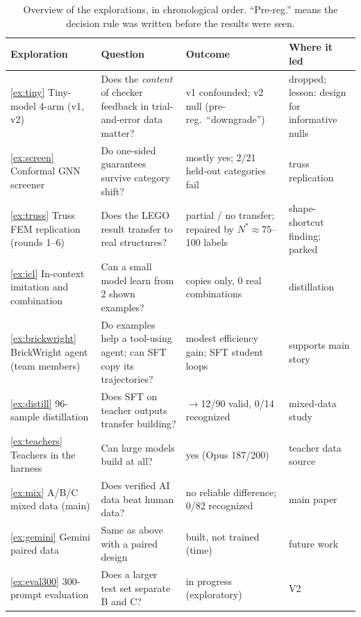 \begin{table}[t]
\centering\small
\caption{Overview of the explorations, in chronological order. ``Pre-reg.'' means the decision rule was written before the results were seen.}
\label{tab:explore}
\setlength{\tabcolsep}{4pt}
\begin{tabularx}{\linewidth}{@{}*{4}{>{\raggedright\arraybackslash}X}@{}}
\toprule
Exploration & Question & Outcome & Where it led \\
\midrule
\ref{ex:tiny} Tiny-model 4-arm (v1, v2) & Does the \emph{content} of checker feedback in trial-and-error data matter? & v1 confounded; v2 null (pre-reg.\ ``downgrade'') & dropped; lesson: design for informative nulls \\
\ref{ex:screen} Conformal GNN screener & Do one-sided guarantees survive category shift? & mostly yes; 2/21 held-out categories fail & truss replication \\
\ref{ex:truss} Truss FEM replication (rounds 1--6) & Does the LEGO result transfer to real structures? & partial / no transfer; repaired by $N^\ast\!\approx\!75$--100 labels & shape-shortcut finding; parked \\
\ref{ex:icl} In-context imitation and combination & Can a small model learn from 2 shown examples? & copies only, 0 real combinations & distillation \\
\ref{ex:brickwright} BrickWright agent (team members) & Do examples help a tool-using agent; can SFT copy its trajectories? & modest efficiency gain; SFT student loops & supports main story \\
\ref{ex:distill} 96-sample distillation & Does SFT on teacher outputs transfer building? & 0$\to$12/90 valid, 0/14 recognized & mixed-data study \\
\ref{ex:teachers} Teachers in the harness & Can large models build at all? & yes (Opus 187/200) & teacher data source \\
\ref{ex:mix} A/B/C mixed data (main) & Does verified AI data beat human data? & no reliable difference; 0/82 recognized & main paper \\
\ref{ex:gemini} Gemini paired data & Same as above with a paired design & built, not trained (time) & future work \\
\ref{ex:eval300} 300-prompt evaluation & Does a larger test set separate B and C? & in progress (exploratory) & V2 \\
\bottomrule
\end{tabularx}
\end{table}

